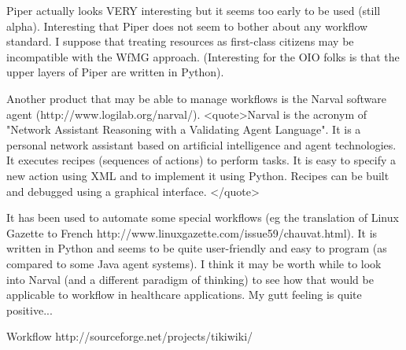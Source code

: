 Piper actually looks VERY interesting but it seems too early to be used
(still alpha).  Interesting that Piper does not seem to bother about any
workflow standard.  I suppose that treating resources as first-class
citizens may be incompatible with the WfMG approach.  (Interesting for the
OIO folks is that the upper layers of Piper are written in Python).

Another product that may be able to manage workflows is the Narval software
agent (http://www.logilab.org/narval/).  <quote>Narval is the acronym of
"Network Assistant Reasoning with a Validating Agent Language". It is a
personal network assistant based on artificial intelligence and agent
technologies. It executes recipes (sequences of actions) to perform tasks.
It is easy to specify a new action using XML and to implement it using
Python. Recipes can be built and debugged using a graphical
interface.  </quote>

It has been used to automate some special workflows (eg the translation of
Linux Gazette to French
http://www.linuxgazette.com/issue59/chauvat.html).  It is written in Python
and seems to be quite user-friendly and easy to program  (as compared to
some Java agent systems).  I think it may be worth while to look into
Narval (and a different paradigm of thinking) to see how that would be
applicable to workflow in healthcare applications.  My gutt feeling is
quite positive...

Workflow
http://sourceforge.net/projects/tikiwiki/
